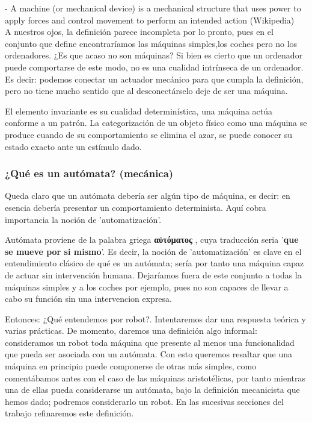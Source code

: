 - A machine (or mechanical device) is a mechanical structure that uses power to apply forces and control movement to perform an intended action (Wikipedia) \\

A nuestros ojos, la definición parece incompleta por lo pronto, pues en el conjunto que define encontraríamos las máquinas simples,los coches pero no los ordenadores. ¿Es que acaso no son máquinas? Si bien es cierto que un ordenador puede comportarse de este modo, no es una cualidad intrínseca de un ordenador. Es decir: podemos conectar un actuador mecánico para que cumpla la definición, pero no tiene mucho sentido que al desconectárselo deje de ser una máquina. 

\vspace{10px}

El elemento invariante es su cualidad determinística, una máquina actúa conforme a un patrón. La categorización de un objeto físico como una máquina se produce cuando de su comportamiento se elimina el azar, se puede conocer su estado exacto ante un estímulo dado.



\subsubsection{¿Qué es un autómata? (mecánica)}

Queda claro que un autómata debería ser algún tipo de máquina, es decir: en esencia debería presentar un comportamiento determinista. Aquí cobra importancia la noción de 'automatización'.

\vspace{10px}

Autómata proviene de la palabra griega \textbf{\textgreek{αὐτόματος}} , cuya traducción seria '\textbf{que se mueve por si mismo}'. Es decir, la noción de 'automatización' es clave en el entendimiento clásico de  qué es un autómata; sería por tanto una máquina capaz de actuar sin intervención humana. Dejaríamos fuera de este conjunto a todas la máquinas simples y a los coches por ejemplo, pues no son capaces de llevar a cabo su función sin una intervencion expresa.

\vspace{10px}

Entonces: ¿Qué entendemos por robot?. Intentaremos dar una respuesta teórica y varias prácticas. De momento, daremos una definición algo informal: consideramos un robot toda máquina que presente al menos una funcionalidad que pueda ser asociada con un autómata. Con esto queremos resaltar que una máquina en principio puede componerse de otras más simples, como comentábamos antes con el caso de las máquinas aristotélicas, por tanto mientras una de ellas pueda considerarse un autómata, bajo la definición mecanicista que hemos dado; podremos considerarlo un robot. En las sucesivas secciones del trabajo refinaremos este definición.

\newpage
